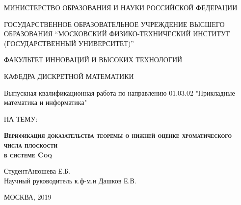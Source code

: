 \thispagestyle{empty}%
\begin{center}%
\MakeUppercase{МИНИСТЕРСТВО ОБРАЗОВАНИЯ И НАУКИ РОССИЙСКОЙ ФЕДЕРАЦИИ}
\end{center}%
\begin{center}%
\MakeUppercase{ГОСУДАРСТВЕННОЕ ОБРАЗОВАТЕЛЬНОЕ УЧРЕЖДЕНИЕ
ВЫСШЕГО ОБРАЗОВАНИЯ
``МОСКОВСКИЙ ФИЗИКО-ТЕХНИЧЕСКИЙ ИНСТИТУТ
(ГОСУДАРСТВЕННЫЙ УНИВЕРСИТЕТ)''}
\end{center}%
\begin{center}%
\MakeUppercase{ФАКУЛЬТЕТ ИННОВАЦИЙ И ВЫСОКИХ ТЕХНОЛОГИЙ}
\end{center}%
\begin{center}%
\MakeUppercase{КАФЕДРА ДИСКРЕТНОЙ МАТЕМАТИКИ}
\end{center}%
\hrulefill
%

\vspace{8em}

\begin{center}
\Large Выпускная квалификационная работа по направлению 01.03.02 "Прикладные математика и информатика"
\end{center}
\begin{center}
\MakeUppercase{\Large{на тему:}}
\end{center}

\vspace{2.5em}

\begin{center}
\textsc{\large{\textbf{Верификация доказательства теоремы о нижней оценке хроматического числа плоскости\\в системе Coq}}}
\end{center}



\vspace{6em}

\begin{flushleft}
Студент\hrulefill Анюшева Е.Б. \\
\vspace{1.5em}
Научный руководитель к.ф-м.н \hrulefill Дашков Е.В.\\

\end{flushleft}
\vspace{\fill}

\begin{center}
МОСКВА, 2019
\end{center}
\newpage
